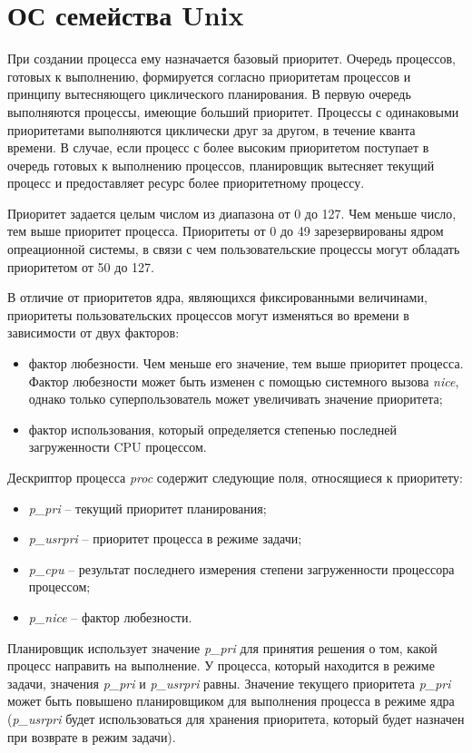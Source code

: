 \section{ОС семейства Unix}

При создании процесса ему назначается базовый приоритет.
Очередь процессов, готовых к выполнению, формируется согласно приоритетам процессов и принципу вытесняющего циклического планирования. В первую очередь выполняются процессы, имеющие больший приоритет. Процессы с одинаковыми приоритетами выполняются циклически друг за другом, в течение кванта времени. В случае, если процесс с более высоким приоритетом поступает в очередь готовых к выполнению процессов, планировщик вытесняет текущий процесс и предоставляет ресурс более приоритетному процессу.

Приоритет задается целым числом из диапазона от 0 до 127. Чем меньше число, тем выше приоритет процесса. Приоритеты от 0 до 49 зарезервированы ядром опреационной системы, в связи с чем пользовательские процессы могут обладать приоритетом от 50 до 127.

В отличие от приоритетов ядра, являющихся фиксированными величинами, приоритеты пользовательских процессов могут изменяться во времени в зависимости от двух факторов:

\begin{itemize}
	\item фактор любезности. Чем меньше его значение, тем выше приоритет процесса. Фактор любезности может быть изменен с помощью системного вызова \textit{nice}, однако только суперпользователь может увеличивать значение приоритета;
	\item фактор использования, который определяется степенью последней загруженности CPU процессом.
\end{itemize}

Дескриптор процесса \textit{proc} содержит следующие поля, относящиеся к приоритету:
\begin{itemize}
    \item \textit{p\_pri} – текущий приоритет планирования;
    \item \textit{p\_usrpri} – приоритет процесса в режиме задачи;
    \item \textit{p\_cpu} – результат последнего измерения степени загруженности процессора процессом;
    \item \textit{p\_nice} – фактор любезности.
\end{itemize}

Планировщик использует значение \textit{p\_pri} для принятия решения о том, какой процесс направить на выполнение. У процесса, который находится в режиме задачи, значения \textit{p\_pri} и \textit{p\_usrpri} равны. Значение текущего приоритета \textit{p\_pri} может быть повышено планировщиком для выполнения процесса в режиме ядра (\textit{p\_usrpri} будет использоваться для хранения приоритета, который будет назначен при возврате в режим задачи).

